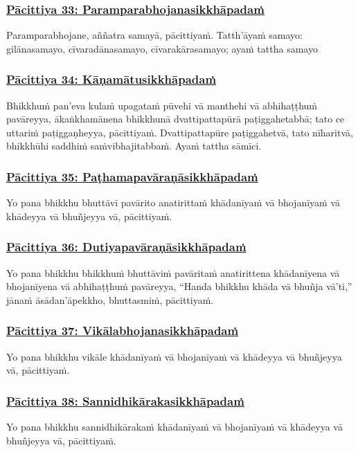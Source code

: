 \subsubsection*{\hyperref[exp33]{Pācittiya 33: Paramparabhojanasikkhāpadaṁ}}
\label{pac33}
Paramparabhojane, aññatra samayā, pācittiyaṁ. Tatth'āyaṁ samayo: gilānasamayo, cīvaradānasamayo, cīvarakārasamayo; ayaṁ tattha samayo

\subsubsection*{\hyperref[exp34]{Pācittiya 34: Kāṇamātusikkhāpadaṁ}}
\label{pac34}
Bhikkhuṁ pan'eva kulaṁ upagataṁ pūvehi vā manthehi vā abhihaṭṭhuṁ pavāreyya, ākaṅkhamānena bhikkhunā dvattipattapūrā paṭiggahetabbā; tato ce uttariṁ paṭiggaṇheyya, pācittiyaṁ. Dvattipattapūre paṭiggahetvā, tato nīharitvā, bhikkhūhi saddhiṁ saṁvibhajitabbaṁ. Ayaṁ tattha sāmīci.

\subsubsection*{\hyperref[exp35]{Pācittiya 35: Paṭhamapavāraṇāsikkhāpadaṁ}}
\label{pac35}
Yo pana bhikkhu bhuttāvī pavārito anatirittaṁ khādanīyaṁ vā bhojanīyaṁ vā khādeyya vā bhuñjeyya vā, pācittiyaṁ.

\subsubsection*{\hyperref[exp36]{Pācittiya 36: Dutiyapavāraṇāsikkhāpadaṁ}}
\label{pac36}
Yo pana bhikkhu bhikkhuṁ bhuttāviṁ pavāritaṁ anatirittena khādanīyena vā bhojanīyena vā abhihaṭṭhuṁ pavāreyya, ``Handa bhikkhu khāda vā bhuñja vā'ti,'' jānaṁ āsādan'āpekkho, bhuttasmiṁ, pācittiyaṁ.

\subsubsection*{\hyperref[exp37]{Pācittiya 37: Vikālabhojanasikkhāpadaṁ}}
\label{pac37}
Yo pana bhikkhu vikāle khādanīyaṁ vā bhojanīyaṁ vā khādeyya vā bhuñjeyya vā, pācittiyaṁ.

\subsubsection*{\hyperref[exp38]{Pācittiya 38: Sannidhikārakasikkhāpadaṁ}}
\label{pac38}
Yo pana bhikkhu sannidhikārakaṁ khādanīyaṁ vā bhojanīyaṁ vā khādeyya vā bhuñjeyya vā, pācittiyaṁ.


